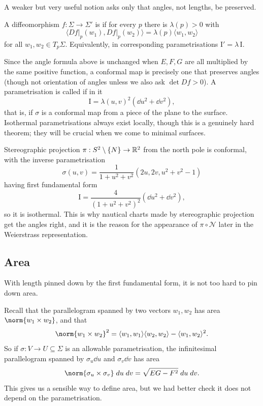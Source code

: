 \documentclass[a4paper]{scrartcl}
\begin{document}
A weaker but very useful notion asks only that angles, not lengths, be preserved.

\begin{definition}[Conformal]
    A diffeomorphism $f: \Sigma \rightarrow \Sigma'$ is  if for every $p$ there is $\lambda(p) > 0$ with
    $$
    \langle \left.Df\right|_p(w_1), \left.Df\right|_p(w_2)\rangle = \lambda(p)\langle w_1, w_2\rangle
    $$
    for all $w_1, w_2 \in T_p\Sigma$. Equivalently, in corresponding parametrisations $\mathrm{I}' = \lambda\, \mathrm{I}$.
\end{definition}

Since the angle formula above is unchanged when $E, F, G$ are all multiplied by the same positive function, a conformal map is precisely one that preserves angles (though not orientation of angles unless we also ask $\det Df > 0$). A parametrisation is called  if in it
$$
\mathrm{I} = \lambda(u,v)^2\left(\dd u^2 + \dd v^2\right),
$$
that is, if $\sigma$ is a conformal map from a piece of the plane to the surface. Isothermal parametrisations always exist locally, though this is a genuinely hard theorem; they will be crucial when we come to minimal surfaces.

\begin{example}
    Stereographic projection $\pi: S^2 \setminus\{N\} \rightarrow \mathbb{R}^2$ from the north pole is conformal, with the inverse parametrisation
    $$
    \sigma(u,v) = \frac{1}{1 + u^2+v^2}\left(2u, 2v, u^2+v^2-1\right)
    $$
    having first fundamental form
    $$
    \mathrm{I} = \frac{4}{(1+u^2+v^2)^2}\left(\dd u^2 + \dd v^2\right),
    $$
    so it is isothermal. This is why nautical charts made by stereographic projection get the angles right, and it is the reason for the appearance of $\pi \circ \mathcal{N}$ later in the Weierstrass representation.
\end{example}

\subsection{Area}

With length pinned down by the first fundamental form, it is not too hard to pin down area.

Recall that the parallelogram spanned by two vectors $w_1, w_2$ has area $\norm{w_1\times w_2}$, and that
$$
\norm{w_1\times w_2}^2 = \langle w_1, w_1\rangle\langle w_2,w_2\rangle - \langle w_1, w_2\rangle^2.
$$
So if $\sigma: V \rightarrow U \subseteq \Sigma$ is an allowable parametrisation, the infinitesimal parallelogram spanned by $\sigma_u \dd u$ and $\sigma_v \dd v$ has area
$$
\norm{\sigma_u \times \sigma_v}\dd u \dd v = \sqrt{EG-F^2}\dd u\dd v.
$$
This gives us a sensible way to define area, but we had better check it does not depend on the parametrisation.
\end{document}
